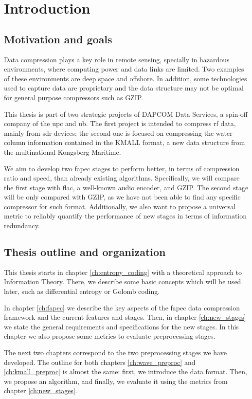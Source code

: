 \chapter{Introduction}
\section{Motivation and goals}
Data compression plays a key role in remote sensing, specially in hazardous environments, where computing power and data links are limited. Two examples of these environments are deep space and offshore. In addition, some technologies used to capture data are proprietary and the data structure may not be optimal for general purpose compressors such as GZIP.

This thesis is part of two strategic projects of DAPCOM Data Services, a spin-off company of the \acrshort{upc} and \acrshort{ub}. The first project is intended to compress \acrfull{rf} data, mainly from \acrshort{sdr} devices; the second one is focused on compressing the water column information contained in the KMALL format, a new data structure from the multinational Kongsberg Maritime.

We aim to develop two \acrshort{fapec} stages to perform better, in terms of compression ratio and speed, than already existing algorithms. Specifically, we will compare the first stage with \acrshort{flac}, a well-known audio encoder, and GZIP. The second stage will be only compared with GZIP, as we have not been able to find any specific compressor for such format. Additionally, we also want to propose a universal metric to reliably quantify the performance of new stages in terms of information redundancy.

\section{Thesis outline and organization}
This thesis starts in chapter \ref{ch:entropy_coding} with a theoretical approach to Information Theory. There, we describe some basic concepts which will be used later, such as differential entropy or Golomb coding.

In chapter \ref{ch:fapec} we describe the key aspects of the \acrshort{fapec} data compression framework and the current features and stages. Then, in chapter \ref{ch:new_stages} we state the general requirements and specifications for the new stages. In this chapter we also propose some metrics to evaluate preprocessing stages.

The next two chapters correspond to the two preprocessing stages we have developed. The outline for both chapters \ref{ch:wave_preproc} and \ref{ch:kmall_preproc} is almost the same: first, we introduce the data format. Then, we propose an algorithm, and finally, we evaluate it using the metrics from chapter \ref{ch:new_stages}.

